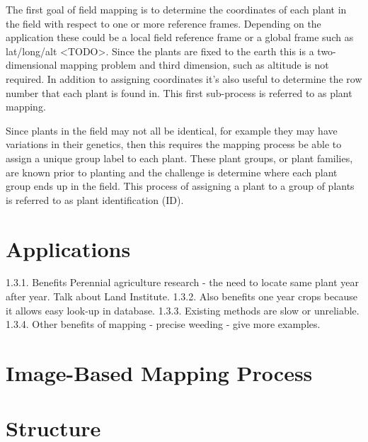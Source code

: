 The first goal of field mapping is to determine the coordinates of each plant in the field with respect to one or more reference frames.  Depending on the application these could be a local field reference frame or a global frame such as lat/long/alt <TODO>.  Since the plants are fixed to the earth this is a two-dimensional mapping problem and third dimension, such as altitude is not required.  In addition to assigning coordinates it's also useful to determine the row number that each plant is found in.  This first sub-process is referred to as plant mapping. 

Since plants in the field may not all be identical, for example they may have variations in their genetics, then this requires the mapping process be able to assign a unique group label to each plant.  These plant groups, or plant families, are known prior to planting and the challenge is determine where each plant group ends up in the field.  This process of assigning a plant to a group of plants is referred to as plant identification (ID).



\section{Applications}
1.3.1.	Benefits Perennial agriculture research - the need to locate same plant year after year.  Talk about Land Institute.
1.3.2.	Also benefits one year crops because it allows easy look-up in database.  
1.3.3.	Existing methods are slow or unreliable.
1.3.4.	Other benefits of mapping - precise weeding - give more examples.

\section{Image-Based Mapping Process}


\section{Structure} 
 
